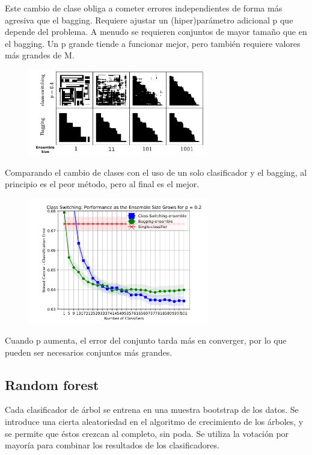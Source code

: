 Este cambio de clase obliga a cometer errores independientes de forma más agresiva que el bagging. Requiere ajustar un (hiper)parámetro adicional p que depende del problema. A menudo se requieren conjuntos de mayor tamaño que en el bagging. Un p grande tiende a funcionar mejor, pero también requiere valores más grandes de M. 

\begin{figure}[h]
\centering
\includegraphics[width = 0.7\textwidth]{figs/bagging-classswitching.png}
\end{figure}

Comparando el cambio de clases con el uso de un solo clasificador y el bagging, al principio es el peor método, pero al final es el mejor.

\begin{figure}[h]
\centering
\includegraphics[width = 0.7\textwidth]{figs/noclass-bagging-classswitching.png}
\end{figure}

Cuando p aumenta, el error del conjunto tarda más en converger, por lo que pueden ser necesarios conjuntos más grandes.

\subsection{Random forest}
Cada clasificador de árbol se entrena en una muestra bootstrap de los datos. Se introduce una cierta aleatoriedad en el algoritmo de crecimiento de los árboles, y se permite que éstos crezcan al completo, sin poda. Se utiliza la votación por mayoría para combinar los resultados de los clasificadores. 

